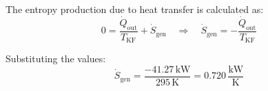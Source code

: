 The entropy production due to heat transfer is calculated as:  
\[
0 = \frac{\dot{Q}_{\text{out}}}{T_{\text{KF}}} + \dot{S}_{\text{gen}} \quad \Rightarrow \quad \dot{S}_{\text{gen}} = -\frac{\dot{Q}_{\text{out}}}{T_{\text{KF}}}
\]  

Substituting the values:  
\[
\dot{S}_{\text{gen}} = \frac{-41.27 \, \text{kW}}{295 \, \text{K}} = 0.720 \, \frac{\text{kW}}{\text{K}}
\]